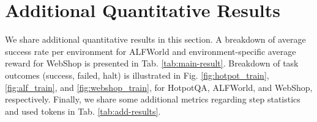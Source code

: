 \documentclass[letterpaper]{article} %
\begin{document}
\section{Additional Quantitative Results}
We share additional quantitative results in this section. A breakdown of average success rate per environment for ALFWorld and environment-specific average reward for WebShop is presented in Tab. \ref{tab:main-result}. Breakdown of task outcomes (success, failed, halt) is illustrated in Fig. \ref{fig:hotpot_train}, \ref{fig:alf_train}, and \ref{fig:webshop_train}, for HotpotQA, ALFWorld, and WebShop, respectively. Finally, we share some additional metrics regarding step statistics and used tokens in Tab. \ref{tab:add-results}.
\begin{table}[ht]
\centering
{}
    \caption{\textbf{Environment-Specific Scores.} We present the decomposed ALFWorld success rate per environment name and the WebShop mean environment average reward (See Appendix \ref{sec:webshop_reward_function} for the reward function).}
    \label{tab:main-result}
\end{table} 
\end{document}
